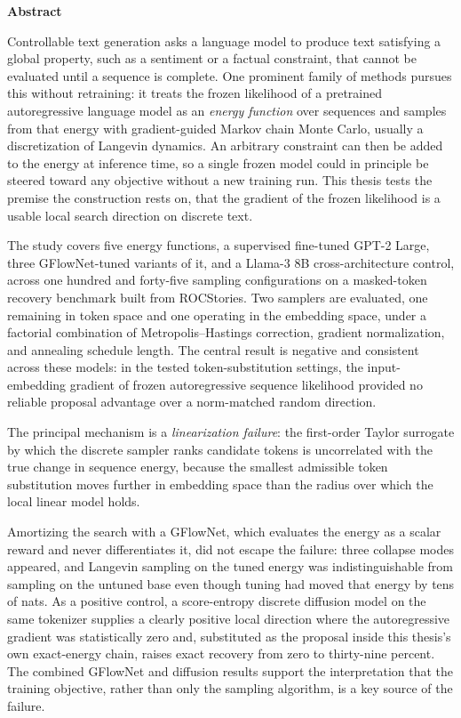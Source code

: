 \thispagestyle{empty}
\begin{center}
    {\Large\bfseries Abstract}
\end{center}
\vspace{0.3cm}

\noindent Controllable text generation asks a language model to produce text satisfying a global property, such as a sentiment or a factual constraint, that cannot be evaluated until a sequence is complete. One prominent family of methods pursues this without retraining: it treats the frozen likelihood of a pretrained autoregressive language model as an \emph{energy function} over sequences and samples from that energy with gradient-guided Markov chain Monte Carlo, usually a discretization of Langevin dynamics. An arbitrary constraint can then be added to the energy at inference time, so a single frozen model could in principle be steered toward any objective without a new training run. This thesis tests the premise the construction rests on, that the gradient of the frozen likelihood is a usable local search direction on discrete text.

\noindent The study covers five energy functions, a supervised fine-tuned GPT-2 Large, three GFlowNet-tuned variants of it, and a Llama-3 8B cross-architecture control, across one hundred and forty-five sampling configurations on a masked-token recovery benchmark built from ROCStories. Two samplers are evaluated, one remaining in token space and one operating in the embedding space, under a factorial combination of Metropolis--Hastings correction, gradient normalization, and annealing schedule length. The central result is negative and consistent across these models: in the tested token-substitution settings, the input-embedding gradient of frozen autoregressive sequence likelihood provided no reliable proposal advantage over a norm-matched random direction.

\noindent The principal mechanism is a \emph{linearization failure}: the first-order Taylor surrogate by which the discrete sampler ranks candidate tokens is uncorrelated with the true change in sequence energy, because the smallest admissible token substitution moves further in embedding space than the radius over which the local linear model holds.

\noindent Amortizing the search with a GFlowNet, which evaluates the energy as a scalar reward and never differentiates it, did not escape the failure: three collapse modes appeared, and Langevin sampling on the tuned energy was indistinguishable from sampling on the untuned base even though tuning had moved that energy by tens of nats. As a positive control, a score-entropy discrete diffusion model on the same tokenizer supplies a clearly positive local direction where the autoregressive gradient was statistically zero and, substituted as the proposal inside this thesis's own exact-energy chain, raises exact recovery from zero to thirty-nine percent. The combined GFlowNet and diffusion results support the interpretation that the training objective, rather than only the sampling algorithm, is a key source of the failure.

